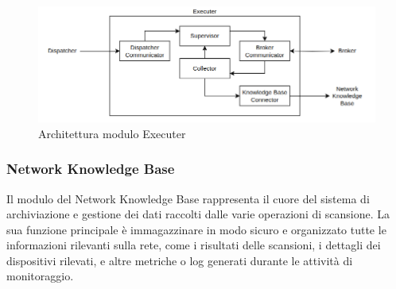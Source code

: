 \documentclass[target=bach,aauheader=,style=]{thud}
\begin{document}
\begin{figure}[t]
  \includegraphics[width=\columnwidth]{executer}
  \centering
  \caption{Architettura modulo Executer}
  \label{executer}
\end{figure}

\FloatBarrier


\subsubsection{Network Knowledge Base} 
Il modulo del Network Knowledge Base rappresenta il cuore del sistema di archiviazione e gestione dei dati raccolti dalle varie operazioni di scansione. La sua funzione principale è immagazzinare in modo sicuro e organizzato tutte le informazioni rilevanti sulla rete, come i risultati delle scansioni, i dettagli dei dispositivi rilevati, e altre metriche o log generati durante le attività di monitoraggio.

\FloatBarrier
\end{document}
